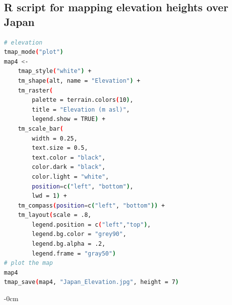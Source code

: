 \documentclass[land,article,submit,pdftex,moreauthors]{Definitions/mdpi}
\begin{document}
\subsection[\appendixname~\thesubsection]{R script for mapping elevation heights over Japan}
\begin{lstlisting}[language=bash, caption=\textbf{R script for mapping elevation heights over Japan}]
# elevation
tmap_mode("plot")
map4 <-
    tmap_style("white") +
    tm_shape(alt, name = "Elevation") +
    tm_raster(
        palette = terrain.colors(10),
        title = "Elevation (m asl)",
        legend.show = TRUE) +
    tm_scale_bar(
        width = 0.25,
        text.size = 0.5,
        text.color = "black",
        color.dark = "black",
        color.light = "white",
        position=c("left", "bottom"),
        lwd = 1) +
    tm_compass(position=c("left", "bottom")) +
    tm_layout(scale = .8,
        legend.position = c("left","top"),
        legend.bg.color = "grey90",
        legend.bg.alpha = .2,
        legend.frame = "gray50")
# plot the map
map4
tmap_save(map4, "Japan_Elevation.jpg", height = 7)
\end{lstlisting}

\begin{adjustwidth}{-\extralength}{0cm}




\end{adjustwidth}
\end{document}
